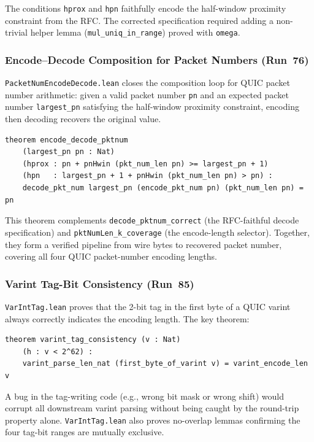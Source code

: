 \documentclass[sigconf,10pt]{acmart}
\begin{document}
The conditions \texttt{hprox} and \texttt{hpn} faithfully encode the
half-window proximity constraint from the RFC.
The corrected specification required adding a non-trivial helper lemma
(\texttt{mul\_uniq\_in\_range}) proved with \texttt{omega}.

\subsubsection{Encode--Decode Composition for Packet Numbers (Run~76)}

\texttt{PacketNumEncodeDecode.lean} closes the composition loop for QUIC
packet number arithmetic: given a valid packet number \texttt{pn} and an
expected packet number \texttt{largest\_pn} satisfying the half-window
proximity constraint, encoding then decoding recovers the original value.

\begin{lstlisting}[caption={\texttt{encode\_decode\_pktnum}: composition theorem.}]
theorem encode_decode_pktnum
    (largest_pn pn : Nat)
    (hprox : pn + pnHwin (pkt_num_len pn) >= largest_pn + 1)
    (hpn   : largest_pn + 1 + pnHwin (pkt_num_len pn) > pn) :
    decode_pkt_num largest_pn (encode_pkt_num pn) (pkt_num_len pn) = pn
\end{lstlisting}

This theorem complements \texttt{decode\_pktnum\_correct} (the RFC-faithful
decode specification) and \texttt{pktNumLen\_k\_coverage} (the encode-length
selector).
Together, they form a verified pipeline from wire bytes to recovered packet
number, covering all four QUIC packet-number encoding lengths.

\subsubsection{Varint Tag-Bit Consistency (Run~85)}

\texttt{VarIntTag.lean} proves that the 2-bit tag in the first byte of a
QUIC varint always correctly indicates the encoding length.
The key theorem:

\begin{lstlisting}[caption={\texttt{varint\_tag\_consistency}: first-byte tag correctness.}]
theorem varint_tag_consistency (v : Nat)
    (h : v < 2^62) :
    varint_parse_len_nat (first_byte_of_varint v) = varint_encode_len v
\end{lstlisting}

A bug in the tag-writing code (e.g., wrong bit mask or wrong shift) would
corrupt all downstream varint parsing without being caught by the round-trip
property alone.
\texttt{VarIntTag.lean} also proves no-overlap lemmas confirming the four
tag-bit ranges are mutually exclusive.
\end{document}

